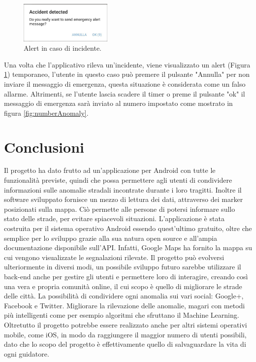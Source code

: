\documentclass[a4paper, 11pt]{article} %
\begin{document}
\begin{figure} %
	\begin{center}
		\includegraphics[width=0.4\textwidth]{images/alert.jpg}
	\end{center}
	\caption{Alert in caso di incidente.}
	\label{fig:accidentDetected}
\end{figure}
Una volta che l'applicativo rileva un'incidente, viene visualizzato un alert (Figura \ref{fig:accidentDetected}) temporaneo, l'utente in questo caso può premere il pulsante "Annulla" per non inviare il messaggio di emergenza, questa situazione è considerata come un falso allarme. Altrimenti, se l'utente lascia scadere il timer o preme il pulsante "ok" il messaggio di emergenza sarà inviato al numero impostato come mostrato in figura \ref{fig:numberAnomaly}. 

\newpage
\section{Conclusioni}
Il progetto ha dato frutto ad un'applicazione per Android con tutte le funzionalità previste, quindi che possa permettere agli utenti di condividere informazioni sulle anomalie stradali incontrate durante i loro tragitti. Inoltre il software sviluppato fornisce un mezzo di lettura dei dati, attraverso dei marker posizionati sulla mappa. Ciò permette alle persone di potersi informare sullo stato delle strade, per evitare spiacevoli situazioni. L'applicazione è stata costruita per il sistema operativo Android essendo quest'ultimo gratuito, oltre che semplice per lo sviluppo grazie alla sua natura open source e all'ampia documentazione disponibile sull'API. Infatti, Google Maps ha fornito la mappa su cui vengono visualizzate le segnalazioni rilevate. Il progetto può evolversi ulteriormente in diversi modi, un possibile sviluppo futuro sarebbe utilizzare il back-end anche per gestire gli utenti e permettere loro di interagire, creando così una vera e propria comunità online, il cui scopo è quello di migliorare le strade delle città. La possibilità di condividere ogni anomalia sui vari social: Google+, Facebook e Twitter. Migliorare la rilevazione delle anomalie, magari con metodi più intelligenti come per esempio algoritmi che sfruttano il Machine Learning. Oltretutto il progetto potrebbe essere realizzato anche per altri sistemi operativi mobile, come iOS, in modo da raggiungere il maggior numero di utenti possibili, dato che lo scopo del progetto è effettivamente quello di salvaguardare la vita di ogni guidatore.
\newpage




\end{document}
